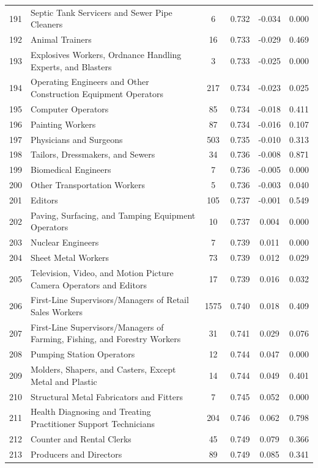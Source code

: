 {\begin{longtable}{llcccc}
 191 & Septic Tank Servicers and Sewer Pipe Cleaners & 6 & 0.732 & -0.034 & 0.000 \\
 192 & Animal Trainers & 16 & 0.733 & -0.029 & 0.469 \\
 193 & Explosives Workers, Ordnance Handling Experts, and Blasters & 3 & 0.733 & -0.025 & 0.000 \\
 194 & Operating Engineers and Other Construction Equipment Operators & 217 & 0.734 & -0.023 & 0.025 \\
 195 & Computer Operators & 85 & 0.734 & -0.018 & 0.411 \\
 196 & Painting Workers & 87 & 0.734 & -0.016 & 0.107 \\
 197 & Physicians and Surgeons & 503 & 0.735 & -0.010 & 0.313 \\
 198 & Tailors, Dressmakers, and Sewers & 34 & 0.736 & -0.008 & 0.871 \\
 199 & Biomedical Engineers & 7 & 0.736 & -0.005 & 0.000 \\
 200 & Other Transportation Workers & 5 & 0.736 & -0.003 & 0.040 \\
 201 & Editors & 105 & 0.737 & -0.001 & 0.549 \\
 202 & Paving, Surfacing, and Tamping Equipment Operators & 10 & 0.737 & 0.004 & 0.000 \\
 203 & Nuclear Engineers & 7 & 0.739 & 0.011 & 0.000 \\
 204 & Sheet Metal Workers & 73 & 0.739 & 0.012 & 0.029 \\
 205 & Television, Video, and Motion Picture Camera Operators and Editors & 17 & 0.739 & 0.016 & 0.032 \\
 206 & First-Line Supervisors/Managers of Retail Sales Workers & 1575 & 0.740 & 0.018 & 0.409 \\
 207 & First-Line Supervisors/Managers of Farming, Fishing, and Forestry Workers & 31 & 0.741 & 0.029 & 0.076 \\
 208 & Pumping Station Operators & 12 & 0.744 & 0.047 & 0.000 \\
 209 & Molders, Shapers, and Casters, Except Metal and Plastic & 14 & 0.744 & 0.049 & 0.401 \\
 210 & Structural Metal Fabricators and Fitters & 7 & 0.745 & 0.052 & 0.000 \\
 211 & Health Diagnosing and Treating Practitioner Support Technicians & 204 & 0.746 & 0.062 & 0.798 \\
 212 & Counter and Rental Clerks & 45 & 0.749 & 0.079 & 0.366 \\
 213 & Producers and Directors & 89 & 0.749 & 0.085 & 0.341 \\

\end{longtable}}
